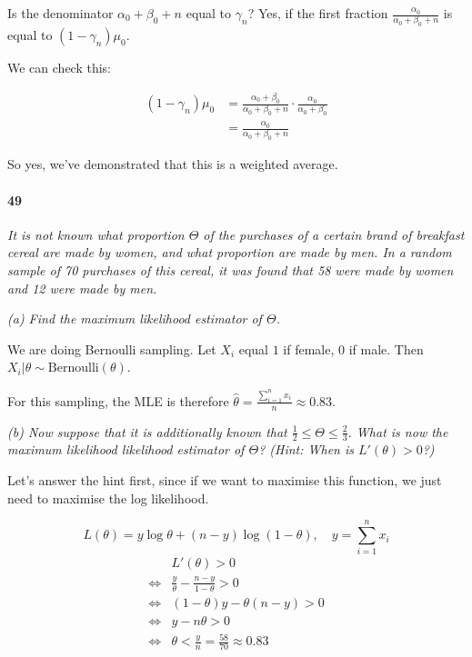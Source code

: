             Is the denominator $\alpha_0 + \beta_0 + n$ equal to $\gamma_n$?
            Yes, if the first fraction $\frac{\alpha_0}{\alpha_0 + \beta_0 +
            n}$ is equal to $(1 - \gamma_n)\mu_0$.

            We can check this:

            \begin{align*}
                (1 - \gamma_n)\mu_0 & = \frac{\alpha_0 + \beta_0}{\alpha_0 +
                    \beta_0 + n} \cdot \frac{\alpha_0}{\alpha_0 + \beta_0}\\
                & = \frac{\alpha_0}{\alpha_0 + \beta_0 + n}
            \end{align*}

            So yes, we've demonstrated that this is a weighted average.

        \paragraph{49}
        \textit{It is not known what proportion $\Theta$ of the purchases of
        a certain brand of breakfast cereal are made by women, and what
        proportion are made by men. In a random sample of 70 purchases of
        this cereal, it was found that 58 were made by women and 12 were
        made by men.}

        \textit{(a) Find the maximum likelihood estimator of $\Theta$.}

            We are doing Bernoulli sampling. Let $X_i$ equal $1$ if female,
            $0$ if male. Then $X_i | \theta \sim \text{Bernoulli}(\theta)$.

            For this sampling, the MLE is therefore $\widehat \theta =
            \frac{\sum\limits_{i=1}^n x_i}{n} \approx 0.83$.

        \textit{(b) Now suppose that it is additionally known that
        $\frac{1}{2} \leq \Theta \leq \frac{2}{3}$. What is now the maximum
        likelihood likelihood estimator of $\Theta$? (Hint: When is
        $L'(\theta) > 0$?)}

            Let's answer the hint first, since if we want to maximise this
            function, we just need to maximise the log likelihood.

            \[
                L(\theta) = y\log\theta + (n - y)\log(1 - \theta), \quad y =
                \sum_{i=1}^n x_i
            \]
            \begin{align*}
                & L'(\theta) > 0 \\
                \iff & \frac{y}{\theta} - \frac{n - y}{1 - \theta} > 0 \\
                \iff & (1 - \theta)y - \theta(n - y) > 0 \\
                \iff & y - n\theta > 0 \\
                \iff & \theta < \frac{y}{n} = \frac{58}{70} \approx 0.83
            \end{align*}

